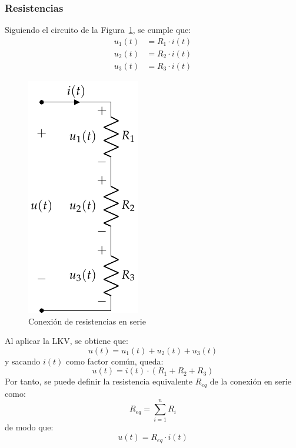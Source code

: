 	\subsubsection{Resistencias}
	Siguiendo el circuito de la Figura~\ref{fig:serie}, se cumple
        que:
        \begin{align*}
          u_1(t) &= R_1 \cdot i(t)\\
          u_2(t) &= R_2 \cdot i(t)\\
          u_3(t) &= R_3 \cdot i(t)
        \end{align*}
        \begin{figure}[H]
          \centering
          \includegraphics[width=0.2\linewidth]{../figs/AsociacionSerie.pdf}
          \caption{Conexión de resistencias en serie}
          \label{fig:serie}
        \end{figure}
        Al aplicar la LKV, se obtiene que:
        \begin{equation*}
          u(t) = u_1(t) + u_2(t) + u_3(t)
        \end{equation*}
        y sacando $i(t)$ como factor común, queda:
        \begin{equation*}
          u(t) = i(t) \cdot (R_1 + R_2 + R_3)
        \end{equation*}
        Por tanto, se puede definir la resistencia equivalente
        $R_{eq}$ de la conexión en serie como:
        \begin{equation}
          \boxed{R_{eq} = \sum_{i = 1}^n R_i}
        \end{equation}
        de modo que:
        \begin{equation*}
          u(t) = R_{eq} \cdot i(t)
        \end{equation*}
		

